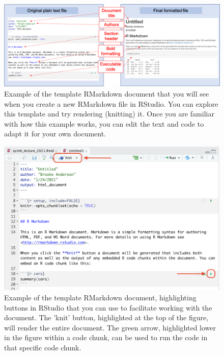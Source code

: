\documentclass[]{tufte-book}
\begin{document}
\begin{figure}
\includegraphics[width=\textwidth]{figures/rmarkdownoriginalfinal} \caption[Example of the template RMarkdown document that you will see when you create a new RMarkdown file in RStudio]{Example of the template RMarkdown document that you will see when you create a new RMarkdown file in RStudio. You can explore this template and try rendering (knitting) it. Once you are familiar with how this example works, you can edit the text and code to adapt it for your own document.}\label{fig:rmarkdownoriginalfinal}
\end{figure}

\begin{figure}
\includegraphics[width=\textwidth]{figures/rmarkdown_template2} \caption[Example of the template RMarkdown document, highlighting buttons in RStudio that you can use to facilitate working with the document]{Example of the template RMarkdown document, highlighting buttons in RStudio that you can use to facilitate working with the document. The 'knit' button, highlighted at the top of the figure, will render the entire document. The green arrow, highlighted lower in the figure within a code chunk, can be used to run the code in that specific code chunk.}\label{fig:rmarkdowntemplate2}
\end{figure}
\end{document}
